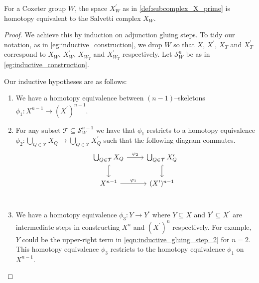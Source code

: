 \documentclass[class=article, crop=false]{standalone}
\begin{document}
\begin{theorem}
    \label{thm:salvetti_cx_equiv_X_prime}
    For a Coxeter group $W$, the space $X^\prime_W$ as in \cref{def:subcomplex_X_prime} is homotopy equivalent to the Salvetti complex $X_W$. 
\end{theorem}
\begin{proof}
    We achieve this by induction on adjunction gluing steps. To tidy our notation, as in \cref{eg:inductive_construction}, we drop $W$ so that $X$, $X^\prime$, $X_T$ and $X^\prime_T$ correspond to $X_W$, $X^\prime_W$, $X_{W_T}$ and $X^\prime_{W_T}$ respectively. Let $\mathcal{S}_W^n$ be as in \cref{eg:inductive_construction}.

    Our inductive hypotheses are as follows:

    \begin{enumerate}
        \item We have a homotopy equivalence between $(n-1)$--skeletons $\phi_1 \colon X^{n-1} \to (X^\prime)^{n-1}$.
        \item For any subset $\mathcal{T} \subseteq \mathcal{S}_W^{n-1}$ we have that $\phi_1$ restricts to a homotopy equivalence $\phi_2 \colon \bigcup_{Q \in \mathcal{T}}X_Q \to \bigcup_{Q \in \mathcal{T}}X^\prime_Q$ such that the following diagram commutes.
        \begin{equation}
            \begin{tikzcd}
    \bigcup_{Q \in \mathcal{T}} X_{Q} \ar[r, "\phi_2" ] \ar[d, hookrightarrow]     &   \bigcup_{Q \in \mathcal{T}} X^\prime_{Q}  \ar[d, hookrightarrow]       \\
    X^{n-1}  \ar[r, "\phi_1"]                                                                 &   (X^\prime)^{n-1}                                                  \\
            \end{tikzcd}
            \label{eqn:commutative_Y_inductive_hyp}  
        \end{equation}
        \item We have a homotopy equivalence $\phi_3 \colon Y \to Y^\prime$ where $Y \subseteq X$ and $Y^\prime \subseteq X^\prime$ are intermediate steps in constructing $X^n$ and $(X^\prime)^n$ respectively. For example, $Y$ could be the upper-right term in \eqref{eqn:inductive_gluing_step_2} for $n=2$. This homotopy equivalence $\phi_3$ restricts to the homotopy equivalence $\phi_1$ on $X^{n-1}$.
    \end{enumerate}


\end{proof}
\end{document}
